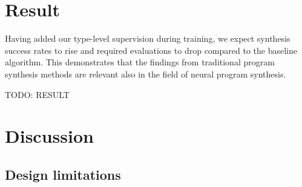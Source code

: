 \documentclass{article}
\begin{document}
\section{Result} %

Having added our type-level supervision during training, we expect synthesis success rates to rise and required evaluations to drop compared to the baseline algorithm.
This demonstrates that the findings from traditional program synthesis methods are relevant also in the field of neural program synthesis.

TODO: RESULT


\section{Discussion} %


\subsection{Design limitations}
\end{document}
